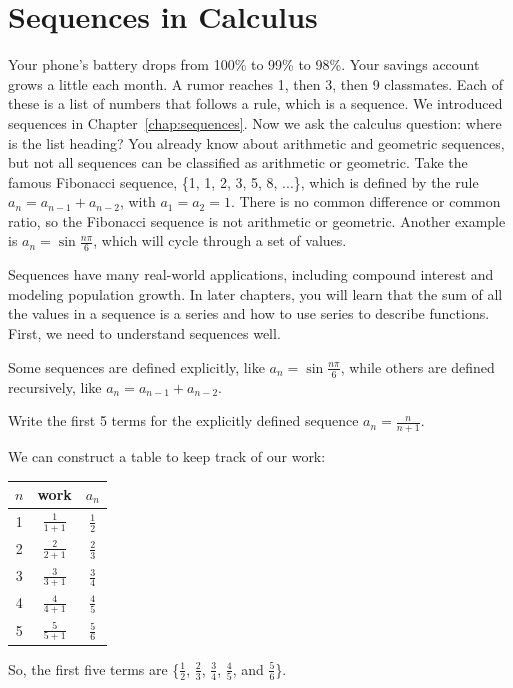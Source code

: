 \chapter{Sequences in Calculus}
Your phone's battery drops from 100\% to 99\% to 98\%. Your savings account
grows a little each month. A rumor reaches 1, then 3, then 9 classmates.
Each of these is a list of numbers that follows a rule, which is a sequence.
We introduced sequences in Chapter~\ref{chap:sequences}. Now we ask the
calculus question: where is the list heading? You already know about arithmetic and
geometric sequences, but not all sequences can be classified as arithmetic or
geometric. Take the famous Fibonacci sequence, \{1, 1, 2, 3, 5, 8, ...\},
which is defined by the rule $a_n = a_{n-1} + a_{n-2}$, with $a_1 = a_2
    = 1$. There is no common difference or common ratio, so the Fibonacci sequence
is not arithmetic or geometric. Another example is $a_n = \sin{\frac{n\pi}{6}}$,
which will cycle through a set of values.

Sequences have many real-world applications, including compound interest and
modeling population growth. In later chapters, you will learn that the sum of
all the values in a sequence is a series and how to use series to describe
functions. First, we need to understand sequences well.

Some sequences are defined explicitly, like $a_n = \sin{\frac{n\pi}{6}}$, while
others are defined recursively, like $a_n = a_{n-1} + a_{n-2}$.

\begin{Worked}
\begin{Problem}
Write the first 5 terms for the explicitly defined sequence $a_n =
    \frac{n}{n+1}$.
\end{Problem}
\begin{Solution}
We can construct a table to keep track of our work:
\begin{center}
    \begin{tabular}{|c|c|c|}\hline
        $n$ & work            & $a_n$         \\
        \hline
        1   & $\frac{1}{1+1}$ & $\frac{1}{2}$ \\
        \hline
        2   & $\frac{2}{2+1}$ & $\frac{2}{3}$ \\
        \hline
        3   & $\frac{3}{3+1}$ & $\frac{3}{4}$ \\
        \hline
        4   & $\frac{4}{4+1}$ & $\frac{4}{5}$ \\
        \hline
        5   & $\frac{5}{5+1}$ & $\frac{5}{6}$ \\
        \hline
    \end{tabular}
\end{center}

So, the first five terms are \{$\frac{1}{2}$, $\frac{2}{3}$, $\frac{3}{4}$,
$\frac{4}{5}$, and $\frac{5}{6}$\}.
\end{Solution}
\end{Worked}

